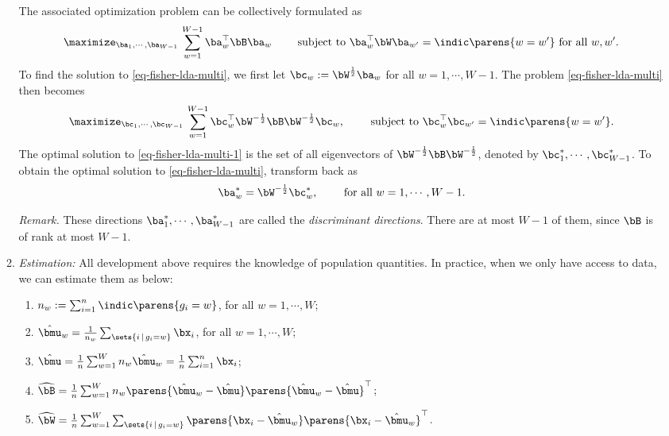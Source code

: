 \documentclass[12pt]{article}
\begin{document}
\begin{enumerate}[label=\textbf{\arabic*.}]
\begin{enumerate}
		The associated optimization problem can be collectively formulated as 
		\begin{align}\label{eq-fisher-lda-multi}
			\maximize_{\ba_1, \cdots, \ba_{W-1}} \, \sum_{w=1}^{W-1} \ba_w^\top \bB \ba_w \qquad \text{ subject to } \ba_w^\top \bW \ba_{w'} = \indic \parens{w = w'} \text{ for all $w, w'$}. 
		\end{align}
		To find the solution to \eqref{eq-fisher-lda-multi}, we first let $\bc_w := \bW^{\frac{1}{2}} \ba_w$ for all $w = 1, \cdots, W-1$. The problem \eqref{eq-fisher-lda-multi} then becomes 
		\begin{align}\label{eq-fisher-lda-multi-1}
			\maximize_{\bc_1, \cdots, \bc_{W-1}} \, \sum_{w=1}^{W-1} \bc_w^\top \bW^{-\frac{1}{2}} \bB \bW^{-\frac{1}{2}} \bc_w, \qquad \text{ subject to } \bc_w^\top \bc_{w'} = \indic \parens{w = w'}. 
		\end{align}
		The optimal solution to \eqref{eq-fisher-lda-multi-1} is the set of all eigenvectors of $\bW^{-\frac{1}{2}} \bB \bW^{-\frac{1}{2}}$, denoted by $\bc_1^*, \cdots, \bc_{W-1}^*$. To obtain the optimal solution to \eqref{eq-fisher-lda-multi}, transform back as 
		\begin{align*}
			\ba_w^* = \bW^{-\frac{1}{2}} \bc_w^*, \qquad \text{ for all } w = 1, \cdots, W - 1. 
		\end{align*}
		
		\textit{Remark.} These directions $\ba_1^*, \cdots, \ba_{W-1}^*$ are called the \emph{discriminant directions}. There are at most $W-1$ of them, since $\bB$ is of rank at most $W-1$. 
		
		\item \textit{Estimation:} All development above requires the knowledge of population quantities. In practice, when we only have access to data, we can estimate them as below: 
		\begin{enumerate}
			\item $n_w := \sum_{i=1}^n \indic \parens{g_i = w}$, for all $w = 1, \cdots, W$; 
			\item $\hat{\bmu}_w = \frac{1}{n_w} \sum_{\sets{i \,\vert\, g_i = w}} \bx_i$, for all $w = 1, \cdots, W$; 
			\item $\hat{\bmu} = \frac{1}{n} \sum_{w=1}^W n_w \hat{\bmu}_w = \frac{1}{n} \sum_{i=1}^n \bx_i$; 
			\item $\widehat{\bB} = \frac{1}{n} \sum_{w=1}^W n_w \parens{\hat{\bmu}_w - \hat{\bmu}} \parens{\hat{\bmu}_w - \hat{\bmu}}^\top$; 
			\item $\widehat{\bW} = \frac{1}{n} \sum_{w=1}^W \sum_{\sets{i \,\vert\, g_i = w}} \parens{\bx_i - \hat{\bmu}_w} \parens{\bx_i - \hat{\bmu}_w}^\top$. 
		\end{enumerate}
		

\end{enumerate}
\end{enumerate}
\end{document}
